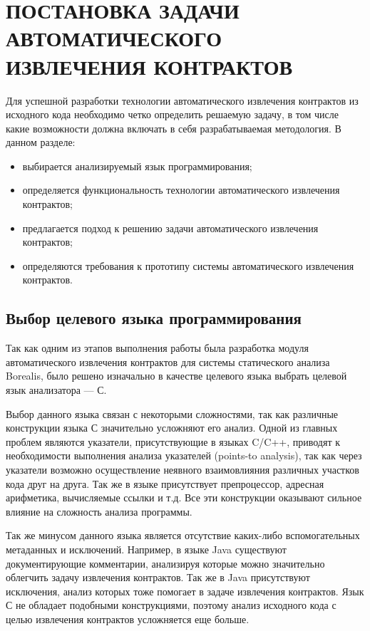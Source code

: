 \chapter{ПОСТАНОВКА ЗАДАЧИ АВТОМАТИЧЕСКОГО ИЗВЛЕЧЕНИЯ КОНТРАКТОВ}
\label{chapter:task}
Для успешной разработки технологии автоматического извлечения контрактов из исходного кода необходимо четко определить решаемую задачу, в том числе какие возможности должна включать в себя разрабатываемая методология. В данном разделе:
\begin{itemize}
\item выбирается анализируемый язык программирования;
\item определяется функциональность технологии автоматического извлечения контрактов;
\item предлагается подход к решению задачи автоматического извлечения контрактов;
\item определяются требования к прототипу системы автоматического извлечения контрактов.
\end{itemize}

\section{Выбор целевого языка программирования}
Так как одним из этапов выполнения работы была разработка модуля автоматического извлечения контрактов для системы статического анализа Borealis\cite{borealis}, было решено изначально в качестве целевого языка выбрать целевой язык анализатора --- С\cite{languageC}.

Выбор данного языка связан с некоторыми сложностями, так как различные конструкции языка С значительно усложняют его анализ. Одной из главных проблем являются указатели, присутствующие в языках C/C++, приводят к необходимости выполнения анализа указателей (points-to analysis), так как через указатели возможно осуществление неявного взаимовлияния различных участков кода друг на друга. Так же в языке присутствует препроцессор, адресная арифметика, вычисляемые ссылки и т.д. Все эти конструкции оказывают сильное влияние на сложность анализа программы.

Так же минусом данного языка является отсутствие каких-либо вспомогательных метаданных и исключений. Например, в языке Java\cite{languageJava} существуют документирующие комментарии, анализируя которые можно значительно облегчить задачу извлечения контрактов. Так же в Java присутствуют исключения, анализ которых тоже помогает в задаче извлечения контрактов. Язык С не обладает подобными конструкциями, поэтому анализ исходного кода с целью извлечения контрактов усложняется еще больше.


